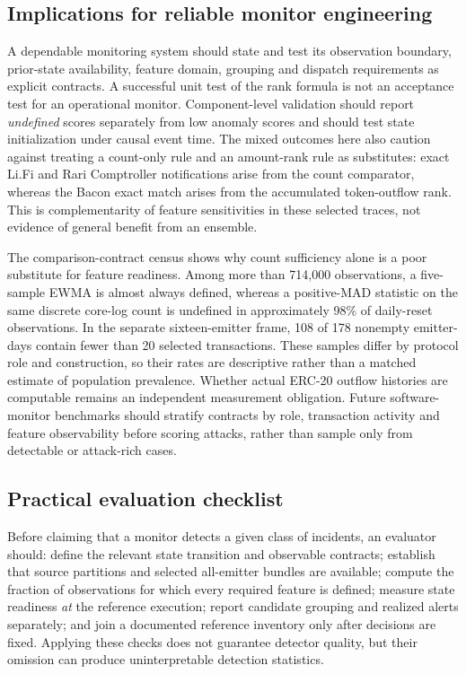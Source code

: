 \documentclass[preprint,12pt,authoryear]{elsarticle}
\begin{document}
\subsection{Implications for reliable monitor engineering}
A dependable monitoring system should state and test its observation boundary, prior-state availability, feature domain, grouping and dispatch requirements as explicit contracts. A successful unit test of the rank formula is not an acceptance test for an operational monitor. Component-level validation should report \emph{undefined} scores separately from low anomaly scores and should test state initialization under causal event time. The mixed outcomes here also caution against treating a count-only rule and an amount-rank rule as substitutes: exact Li.Fi and Rari Comptroller notifications arise from the count comparator, whereas the Bacon exact match arises from the accumulated token-outflow rank. This is complementarity of feature sensitivities in these selected traces, not evidence of general benefit from an ensemble.

The comparison-contract census shows why count sufficiency alone is a poor substitute for feature readiness. Among more than 714,000 observations, a five-sample EWMA is almost always defined, whereas a positive-MAD statistic on the same discrete core-log count is undefined in approximately 98\% of daily-reset observations. In the separate sixteen-emitter frame, 108 of 178 nonempty emitter-days contain fewer than 20 selected transactions. These samples differ by protocol role and construction, so their rates are descriptive rather than a matched estimate of population prevalence. Whether actual ERC-20 outflow histories are computable remains an independent measurement obligation. Future software-monitor benchmarks should stratify contracts by role, transaction activity and feature observability before scoring attacks, rather than sample only from detectable or attack-rich cases.

\subsection{Practical evaluation checklist}
Before claiming that a monitor detects a given class of incidents, an evaluator should: define the relevant state transition and observable contracts; establish that source partitions and selected all-emitter bundles are available; compute the fraction of observations for which every required feature is defined; measure state readiness \emph{at} the reference execution; report candidate grouping and realized alerts separately; and join a documented reference inventory only after decisions are fixed. Applying these checks does not guarantee detector quality, but their omission can produce uninterpretable detection statistics.
\end{document}
